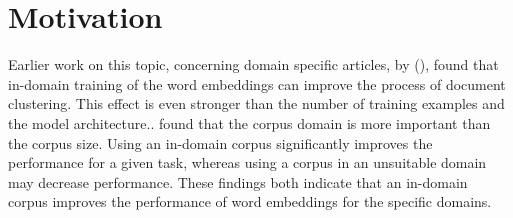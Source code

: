 \documentclass[../../Thesis.tex]{subfiles}
\begin{document}
\section{Motivation}
Earlier work on this topic, concerning domain specific articles, by (\citet{Truong2017Thesis}), found that  
in-domain training of the word embeddings can  improve the process of document clustering. This effect is even stronger than the number of training examples and the model architecture.\cite{Truong2017Thesis}. 
\citet{lai2016generate} found that 
the corpus domain is more important than the corpus size. Using an in-domain corpus significantly improves the performance for a given task, whereas using a corpus in an unsuitable domain may decrease performance. 
These findings both indicate that an in-domain corpus improves the performance of word embeddings for the specific domains.
\end{document}
